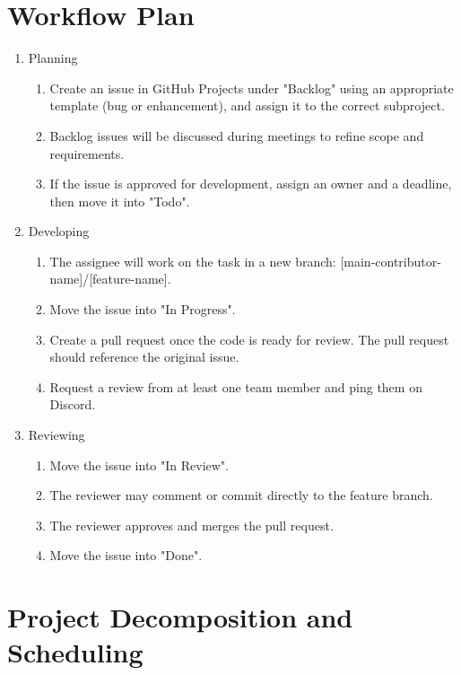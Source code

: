 \documentclass{article}
\begin{document}
\section{Workflow Plan}

\begin{enumerate}
  \item Planning
        \begin{enumerate}
          \item Create an issue in GitHub Projects under "Backlog" using an appropriate
                template (bug or enhancement), and assign it to the correct subproject.
          \item Backlog issues will be discussed during meetings to refine scope and
                requirements.
          \item If the issue is approved for development, assign an owner and a deadline, then
                move it into "Todo".
        \end{enumerate}
  \item Developing
        \begin{enumerate}
          \item The assignee will work on the task in a new branch:
                [main-contributor-name]/[feature-name].
          \item Move the issue into "In Progress".
          \item Create a pull request once the code is ready for review. The pull request
                should reference the original issue.
          \item Request a review from at least one team member and ping them on Discord.
        \end{enumerate}
  \item Reviewing
        \begin{enumerate}
          \item Move the issue into "In Review".
          \item The reviewer may comment or commit directly to the feature branch.
          \item The reviewer approves and merges the pull request.
          \item Move the issue into "Done".
        \end{enumerate}
\end{enumerate}

\section{Project Decomposition and Scheduling}
\end{document}
